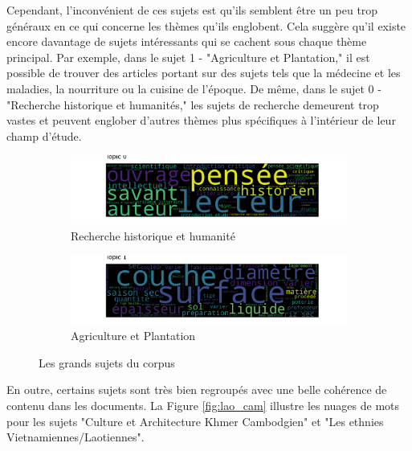 Cependant, l'inconvénient de ces sujets est qu'ils semblent être un peu trop généraux en ce qui concerne les thèmes qu'ils englobent. Cela suggère qu'il existe encore davantage de sujets intéressants qui se cachent sous chaque thème principal. Par exemple, dans le sujet 1 - "Agriculture et Plantation," il est possible de trouver des articles portant sur des sujets tels que la médecine et les maladies, la nourriture ou la cuisine de l'époque. De même, dans le sujet 0 - "Recherche historique et humanités," les sujets de recherche demeurent trop vastes et peuvent englober d'autres thèmes plus spécifiques à l'intérieur de leur champ d'étude.

\begin{figure}[H]
     \centering
     \begin{subfigure}[b]{0.9\textwidth}
         \centering
         \includegraphics[width=\textwidth]{img/wordcloud model ngram 200 topic 0 .png}
         \caption{Recherche historique et humanité}
         \label{fig:tp12_0}
     \end{subfigure}
     \hfill
     \begin{subfigure}[b]{0.9\textwidth}
         \centering
         \includegraphics[width=\textwidth]{img/wordcloud model ngram 200 topic 1 .png}
         \caption{Agriculture et Plantation}
         \label{fig:tp12_1}
     \end{subfigure}
     \hfill
        \caption{Les grands sujets du corpus}
\end{figure}

En outre, certains sujets sont très bien regroupés avec une belle cohérence de contenu dans les documents. La Figure \ref{fig:lao_cam} illustre les nuages de mots pour les sujets "Culture et Architecture Khmer Cambodgien" et "Les ethnies Vietnamiennes/Laotiennes".

